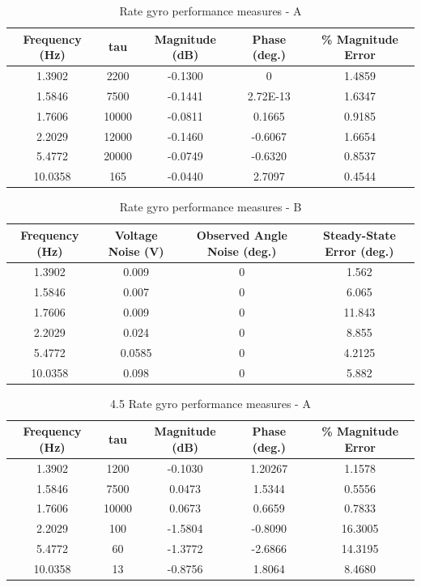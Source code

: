 \documentclass{article}
\theoremstyle{plain}
\theoremstyle{definition}
\theoremstyle{remark}
\begin{document}
\begin{table}
\begin{center}
    \begin{tabular}{|c|c|c|c|c|}
        \hline
        Frequency (Hz) & tau & Magnitude (dB) & Phase (deg.) & \% Magnitude Error \\ \hline
	1.3902 & 2200 & -0.1300  & 0 & 1.4859\\
       1.5846 & 7500 & -0.1441  & 2.72E-13 & 1.6347\\
	1.7606 & 10000 & -0.0811 & 0.1665 & 0.9185  \\
	2.2029& 12000 & -0.1460  & -0.6067 & 1.6654   \\
	5.4772&20000 & -0.0749  & -0.6320 & 0.8537  \\
	10.0358& 165 & -0.0440 & 2.7097 & 0.4544 \\
        \hline
    \end{tabular}
\caption{Rate gyro performance measures - A}  
\label{gyro_tableA}
\end{center}
\end{table}

\begin{table}
\begin{center}
    \begin{tabular}{|c|c|c|c|}
        \hline
        Frequency (Hz)  & Voltage Noise (V) & Observed Angle Noise (deg.) & Steady-State Error (deg.) \\ \hline
	1.3902  & 0.009  & 0 & 1.562\\
       1.5846  & 0.007  & 0 & 6.065 \\
	1.7606  & 0.009 & 0 & 11.843  \\
	2.2029 & 0.024  & 0 & 8.855   \\
	5.4772 & 0.0585  & 0 & 4.2125  \\
	10.0358 & 0.098 & 0 & 5.882 \\
        \hline
    \end{tabular}
\caption{Rate gyro performance measures - B}  
\label{gyro_tableB}
\end{center}
\end{table}

\begin{table}
\begin{center}
    \begin{tabular}{|c|c|c|c|c|}
        \hline
        Frequency (Hz)&tau  & Magnitude (dB) & Phase (deg.) & \% Magnitude Error \\ \hline
	1.3902& 1200  & -0.1030  & 1.20267 & 1.1578\\
       1.5846  & 7500& 0.0473  & 1.5344 & 0.5556\\
	1.7606 & 10000 & 0.0673 & 0.6659 & 0.7833  \\
	2.2029 & 100& -1.5804  & -0.8090 & 16.3005   \\
	5.4772 &60& -1.3772  & -2.6866 & 14.3195  \\
	10.0358 & 13& -0.8756 & 1.8064 & 8.4680 \\
        \hline
    \end{tabular}
\caption{4.5 Rate gyro performance measures - A}  
\label{gyro45_tableA}
\end{center}
\end{table}
\end{document}
